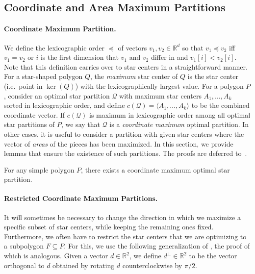 \documentclass{theoretics}
\newcommand{\RR}{\mathbb{R}}
\begin{document}
\subsection{Coordinate and Area Maximum Partitions}
\label{sec:existence}

\paragraph{Coordinate Maximum Partition.}
We define the lexicographic order $\preceq$ of vectors $v_1, v_2 \in \RR^d$ so that $v_1 \preceq v_2$ iff $v_1 = v_2$ or $i$ is the first dimension that $v_1$ and $v_2$ differ in and $v_1[i] < v_2[i]$.
Note that this definition carries over to star centers in a straightforward manner.
For a star-shaped polygon $Q$, the \emph{maximum} star center of $Q$ is the star center (i.e.\ point in $\ker(Q)$) with the lexicographically largest value.
For a polygon $P$, consider an optimal star partition $\mathcal Q$ with maximum star centers $A_1,\ldots,A_k$ sorted in lexicographic order, and define $c(\mathcal Q)=\langle A_1,\ldots,A_k\rangle$ to be the combined coordinate vector.
If $c(\mathcal Q)$ is maximum in lexicographic order among all optimal star partitions of $P$, we say that $\mathcal Q$ is a \emph{coordinate maximum} optimal partition.
In other cases, it is useful to consider a partition with given star centers where the vector of \emph{areas} of the pieces has been maximized.
In this section, we provide lemmas that ensure the existence of such partitions.
The proofs are deferred to~.

\begin{lemma}\label{lem:coordmax}
For any simple polygon $P$, there exists a coordinate maximum optimal star partition.
\end{lemma}


\paragraph{Restricted Coordinate Maximum Partitions.}
It will sometimes be necessary to change the direction in which we maximize a specific subset of star centers, while keeping the remaining ones fixed.
Furthermore, we often have to restrict the star centers that we are optimizing to a subpolygon $F \subseteq P$.
For this, we use the following generalization of , the proof of which is analogous.
Given a vector $d \in \RR^2$, we define $d^\perp \in \RR^2$ to be the vector orthogonal to $d$ obtained by rotating $d$ counterclockwise by $\pi/2$.
\end{document}
